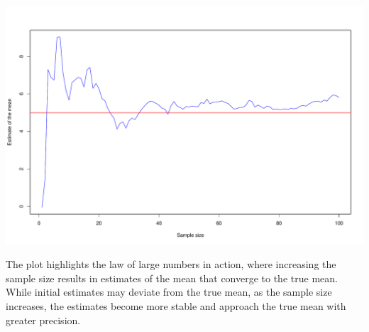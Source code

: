 \documentclass[
  a4paper,
]{article}
\begin{document}
\includegraphics{RMarkdown_files/figure-latex/global_options2-1.pdf}

The plot highlights the law of large numbers in action, where increasing
the sample size results in estimates of the mean that converge to the
true mean. While initial estimates may deviate from the true mean, as
the sample size increases, the estimates become more stable and approach
the true mean with greater precision.
\end{document}
